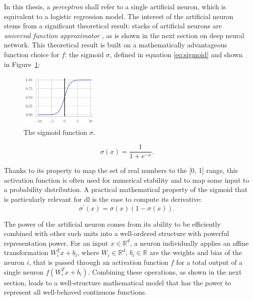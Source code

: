 In this thesis, a \textit{perceptron} shall refer to a single artificial neuron, which is equivalent to a logistic regression model. The interest of the artificial neuron stems from a significant theoretical result: stacks of artificial neurons are \textit{universal function approximator} \cite{universalFuncApproxNN,HORNIK1989359}, as is shown in the next section on deep neural network. This theoretical result is built on a mathematically advantageous function choice for $f$: the sigmoid $\sigma$, defined in equation \ref{eq:sigmoid} and shown in Figure~\ref{fig:sigmoid}:
\begin{figure}
    \begin{center}
        \includegraphics[width=0.35\textwidth]{Images/ML/sigmoid.png}
        \caption{The sigmoid function $\sigma$.} 
        \label{fig:sigmoid}
    \end{center}
\end{figure}

\begin{equation}\label{eq:sigmoid}
    \sigma(x) = \frac{1}{1 + e^{-x}}.
\end{equation}

Thanks to its property to map the set of real numbers to the [0, 1] range, this activation function is often used for numerical stability and to map some input to a probability distribution. A practical mathematical property of the sigmoid that is particularly relevant for \gls{dl} is the ease to compute its derivative: \[\sigma^\prime(x) = \sigma(x) (1- \sigma(x)).\]

The power of the artificial neuron comes from its ability to be efficiently combined with other such units into a well-ordered structure with powerful representation power. For an input $x \in \mathbb{R}^d$, a neuron individually applies an affine transformation $W_i^T x + b_i$, where $W_i \in \mathbb{R}^d,\,b_i \in \mathbb{R}$ are the weights and bias of the neuron $i$, that is passed through an activation function $f$ for a total output of a single neuron $f(W_i^T x + b_i)$. Combining these operations, as shown in the next section, leads to a well-structure mathematical model that has the power to represent all well-behaved continuous functions. 

